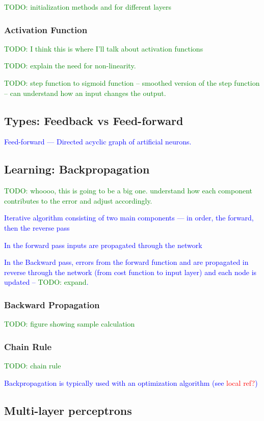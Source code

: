 \textcolor{green}{TODO: initialization methods and for different layers}



\subsubsection{Activation Function}

\textcolor{green}{TODO: I think this is where I'll talk about activation functions}

\textcolor{green}{TODO: explain the need for non-linearity.}

\textcolor{green}{TODO: step function to sigmoid function -- smoothed version of the step function -- can understand how an input changes the output.}

\subsection{Types: Feedback vs Feed-forward}

\textcolor{blue}{Feed-forward --- Directed acyclic graph of artificial neurons.}

\subsection{Learning: Backpropagation}

\textcolor{green}{TODO: whoooo, this is going to be a big one. understand how each component contributes to the error and adjust accordingly.}

\textcolor{blue}{Iterative algorithm consisting of two main components --- in order, the forward, then the reverse pass}

\textcolor{blue}{In the forward pass inputs are propagated through the network}

\textcolor{blue}{In the Backward pass, errors from the forward function and  are propagated in reverse through the network (from cost function to input layer) and each node is updated -- \textcolor{green}{TODO: expand}.}

\subsubsection{Backward Propagation}


\textcolor{green}{TODO: figure showing sample calculation}

\subsubsection{Chain Rule}

\textcolor{green}{TODO: chain rule}

\textcolor{blue}{Backpropagation is typically used with an optimization algorithm (see \textcolor{red}{local ref?})}

\subsection{Multi-layer perceptrons}